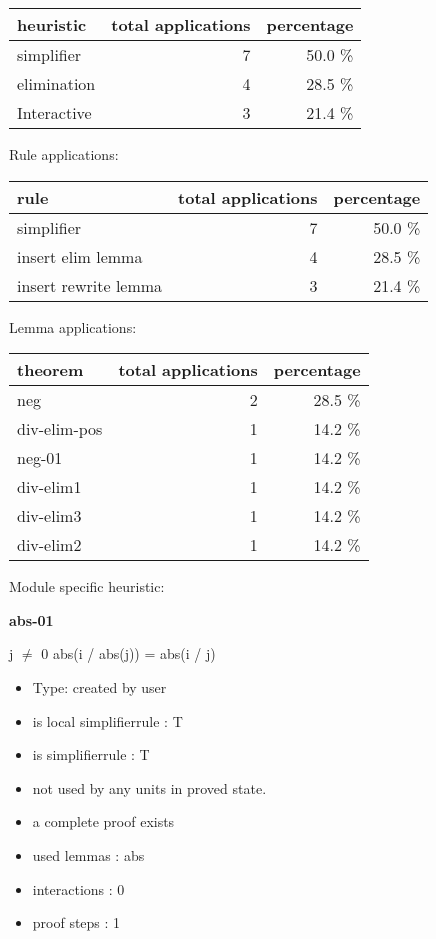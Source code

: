 \documentclass[a4paper]{article}
\begin{document}
\begin{supertabular}{l|r|r}
heuristic	& total applications & percentage \\ \hline
simplifier & 7 & 50.0 \% \\
elimination & 4 & 28.5 \% \\
Interactive & 3 & 21.4 \% \\

\end{supertabular}

Rule applications:

\begin{supertabular}{l|r|r}
rule	        & total applications & percentage \\ \hline
simplifier & 7 & 50.0 \% \\
insert elim lemma & 4 & 28.5 \% \\
insert rewrite lemma & 3 & 21.4 \% \\

\end{supertabular}

Lemma applications:

\begin{supertabular}{l|r|r}
theorem	        & total applications & percentage \\ \hline
neg & 2 & 28.5 \% \\
div-elim-pos & 1 & 14.2 \% \\
neg-01 & 1 & 14.2 \% \\
div-elim1 & 1 & 14.2 \% \\
div-elim3 & 1 & 14.2 \% \\
div-elim2 & 1 & 14.2 \% \\

\end{supertabular}

Module specific heuristic:

\pagebreak

{\LARGE\bf abs-01}\label{lemma-abs-01}

\medskip

j $\neq$ 0 \Fol abs(i / abs(j)) = abs(i / j)

\begin{itemize}

\item Type: created by user

\item is local simplifierrule : T
\item is simplifierrule : T
\item not used by any units in proved state.
\item       a complete proof exists
\item       used lemmas  : abs
\item       interactions : 0
\item       proof steps  : 1
\end{itemize}
\end{document}
